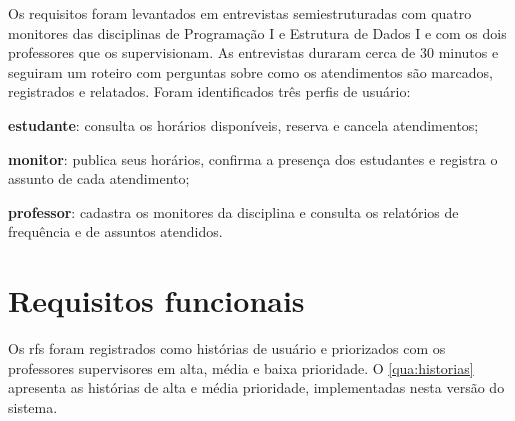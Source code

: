 Os requisitos foram levantados em entrevistas semiestruturadas com quatro
monitores das disciplinas de Programação I e Estrutura de Dados I e com os dois
professores que os supervisionam. As entrevistas duraram cerca de 30 minutos
e seguiram um roteiro com perguntas sobre como os atendimentos são marcados,
registrados e relatados. Foram identificados três perfis de usuário:
\begin{alineas}
  \item \textbf{estudante}: consulta os horários disponíveis, reserva e cancela
        atendimentos;
  \item \textbf{monitor}: publica seus horários, confirma a presença dos
        estudantes e registra o assunto de cada atendimento;
  \item \textbf{professor}: cadastra os monitores da disciplina e consulta os
        relatórios de frequência e de assuntos atendidos.
\end{alineas}

\section{Requisitos funcionais}
\label{sec:requisitos:funcionais}

Os \acp{rf} foram registrados como histórias de usuário \cite{cohn2004user} e
priorizados com os professores supervisores em alta, média e baixa
prioridade. O \cref{qua:historias} apresenta as histórias de alta e média
prioridade, implementadas nesta versão do sistema.

